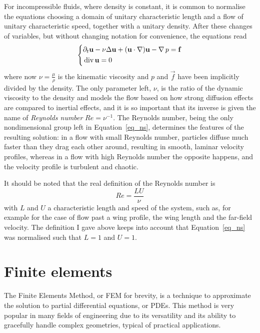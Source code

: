 For incompressible fluids, where density is constant, it is common to
normalise the equations choosing a domain of unitary characteristic
length and a flow of unitary characteristic speed, together with a
unitary density.
After these changes of variables, but without changing notation for
convenience, the equations read
\begin{equation}
  \left\{
    \begin{aligned}
      &\partial_{t} \mathbf{u} - \nu \Delta \mathbf{u} + (\mathbf{u} \cdot \operatorname{\nabla})
        \mathbf{u} - \operatorname{\nabla} p = \mathbf{f} \\
      &\operatorname{div} \mathbf{u} = 0
    \end{aligned}
  \right.
  \label{eq_ns}
\end{equation}
where now \(\nu = \frac{\mu}{\rho}\) is the kinematic viscosity and \(p\)
and \(\vec{f}\) have been implicitly divided by the density.
The only parameter left, \(\nu\), is the ratio of the dynamic viscosity
to the density and models the flow based on how strong diffusion effects
are compared to inertial effects, and it is so important that its inverse
is given the name of \emph{Reynolds number} \(Re = \nu^{-1}\).
The Reynolds number, being the only nondimensional group left in
Equation~\eqref{eq_ns}, determines the features of the resulting
solution: in a flow with small Reynolds number, particles diffuse much
faster than they drag each other around, resulting in smooth, laminar
velocity profiles, whereas in a flow with high Reynolds number the
opposite happens, and the velocity profile is turbulent and chaotic.

It should be noted that the real definition of the Reynolds number is
\begin{equation}
  Re = \frac{LU}{\nu}
  \label{eq_reynolds}
\end{equation}
with \(L\) and \(U\) a characteristic length and speed of the system,
such as, for example for the case of flow past a wing profile, the wing length and
the far-field velocity.
The definition I gave above keeps into account that
Equation~\eqref{eq_ns} was normalised such that \(L = 1\) and \(U = 1\).


\section{Finite elements}
\label{sec_fem}
The Finite Elements Method, or FEM for brevity, is a technique to approximate the solution to partial differential equations, or PDEs.
This method is very popular in many fields of engineering due to its versatility and its ability to gracefully handle complex geometries, typical of practical applications.

